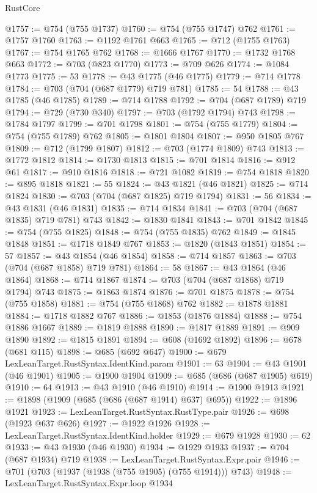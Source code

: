 \begin{lexlean}{RustCore}
\begin{coremodule}
@1757 := @754 (@755 @1737)
@1760 := @754 (@755 @1747) @762
@1761 := @1757 @1760
@1763 := @1192 @1761 @663
@1765 := @712 (@1755 @1763)
@1767 := @754 @1765 @762
@1768 := @1666 @1767
@1770 := @1732 @1768 @663
@1772 := @703 (@823 @1770)
@1773 := @709 @626
@1774 := @1084 @1773
@1775 := 53
@1778 := @43 @1775 (@46 @1775)
@1779 := @714 @1778
@1784 := @703 (@704 (@687 @1779) @719 @781)
@1785 := 54
@1788 := @43 @1785 (@46 @1785)
@1789 := @714 @1788
@1792 := @704 (@687 @1789) @719
@1794 := @729 (@730 @340)
@1797 := @703 (@1792 @1794) @743
@1798 := @1784 @1797
@1799 := @701 @1798
@1801 := @754 (@755 @1779)
@1804 := @754 (@755 @1789) @762
@1805 := @1801 @1804
@1807 := @950 @1805 @767
@1809 := @712 (@1799 @1807)
@1812 := @703 (@1774 @1809) @743
@1813 := @1772 @1812
@1814 := @1730 @1813
@1815 := @701 @1814
@1816 := @912 @61
@1817 := @910 @1816
@1818 := @721 @1082
@1819 := @754 @1818
@1820 := @895 @1818
@1821 := 55
@1824 := @43 @1821 (@46 @1821)
@1825 := @714 @1824
@1830 := @703 (@704 (@687 @1825) @719 @1794)
@1831 := 56
@1834 := @43 @1831 (@46 @1831)
@1835 := @714 @1834
@1841 := @703 (@704 (@687 @1835) @719 @781) @743
@1842 := @1830 @1841
@1843 := @701 @1842
@1845 := @754 (@755 @1825)
@1848 := @754 (@755 @1835) @762
@1849 := @1845 @1848
@1851 := @1718 @1849 @767
@1853 := @1820 (@1843 @1851)
@1854 := 57
@1857 := @43 @1854 (@46 @1854)
@1858 := @714 @1857
@1863 := @703 (@704 (@687 @1858) @719 @781)
@1864 := 58
@1867 := @43 @1864 (@46 @1864)
@1868 := @714 @1867
@1874 := @703 (@704 (@687 @1868) @719 @1794) @743
@1875 := @1863 @1874
@1876 := @701 @1875
@1878 := @754 (@755 @1858)
@1881 := @754 (@755 @1868) @762
@1882 := @1878 @1881
@1884 := @1718 @1882 @767
@1886 := @1853 (@1876 @1884)
@1888 := @754 @1886 @1667
@1889 := @1819 @1888
@1890 := @1817 @1889
@1891 := @909 @1890
@1892 := @1815 @1891
@1894 := @608 (@1692 @1892)
@1896 := @678 (@681 @115)
@1898 := @685 (@692 @647)
@1900 := @679 LexLeanTarget.RustSyntax.IdentKind.param
@1901 := 63
@1904 := @43 @1901 (@46 @1901)
@1905 := @1900 @1904
@1909 := @685 (@686 (@687 @1905) @619)
@1910 := 64
@1913 := @43 @1910 (@46 @1910)
@1914 := @1900 @1913
@1921 := @1898 (@1909 (@685 (@686 (@687 @1914) @637) @695))
@1922 := @1896 @1921
@1923 := LexLeanTarget.RustSyntax.RustType.pair
@1926 := @698 (@1923 @637 @626)
@1927 := @1922 @1926
@1928 := LexLeanTarget.RustSyntax.IdentKind.holder
@1929 := @679 @1928
@1930 := 62
@1933 := @43 @1930 (@46 @1930)
@1934 := @1929 @1933
@1937 := @704 (@687 @1934) @719
@1938 := LexLeanTarget.RustSyntax.Expr.pair
@1946 := @701 (@703 (@1937 (@1938 (@755 @1905) (@755 @1914))) @743)
@1948 := LexLeanTarget.RustSyntax.Expr.loop @1934

\end{coremodule}
\end{lexlean}

